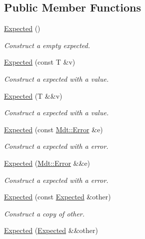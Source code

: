 \subsection*{Public Member Functions}
\begin{DoxyCompactItemize}
\item 
\hyperlink{class_mdt_1_1_expected_ab271cafc564b8dba7c5737a8e6f78a8d}{Expected} ()
\begin{DoxyCompactList}\small\item\em Construct a empty expected. \end{DoxyCompactList}\item 
\hyperlink{class_mdt_1_1_expected_a5046d26152b32d7184d756f00325cd60}{Expected} (const T \&v)
\begin{DoxyCompactList}\small\item\em Construct a expected with a value. \end{DoxyCompactList}\item 
\hyperlink{class_mdt_1_1_expected_abf1fd00a7d5508ab2030f729105de12f}{Expected} (T \&\&v)
\begin{DoxyCompactList}\small\item\em Construct a expected with a value. \end{DoxyCompactList}\item 
\hyperlink{class_mdt_1_1_expected_a98be29378d9ee4d855b041c5a347d967}{Expected} (const \hyperlink{class_mdt_1_1_error}{Mdt\+::\+Error} \&e)
\begin{DoxyCompactList}\small\item\em Construct a expected with a error. \end{DoxyCompactList}\item 
\hyperlink{class_mdt_1_1_expected_a63cf8d36dfb4657d39fcfb614f575ab4}{Expected} (\hyperlink{class_mdt_1_1_error}{Mdt\+::\+Error} \&\&e)
\begin{DoxyCompactList}\small\item\em Construct a expected with a error. \end{DoxyCompactList}\item 
\hyperlink{class_mdt_1_1_expected_a74ad44cec43f7cae5cd73388283818e3}{Expected} (const \hyperlink{class_mdt_1_1_expected}{Expected} \&other)
\begin{DoxyCompactList}\small\item\em Construct a copy of other. \end{DoxyCompactList}\item 
\hyperlink{class_mdt_1_1_expected_a8d14f0fbfb0c4e1acbfbae539f797aa8}{Expected} (\hyperlink{class_mdt_1_1_expected}{Expected} \&\&other)

\end{DoxyCompactItemize}
